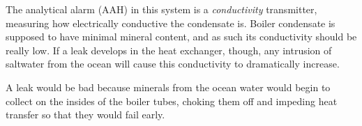 












The analytical alarm (AAH) in this system is a {\it conductivity} transmitter, measuring how electrically conductive the condensate is.  Boiler condensate is supposed to have minimal mineral content, and as such its conductivity should be really low.  If a leak develops in the heat exchanger, though, any intrusion of saltwater from the ocean will cause this conductivity to dramatically increase.

\vskip 10pt

A leak would be bad because minerals from the ocean water would begin to collect on the insides of the boiler tubes, choking them off and impeding heat transfer so that they would fail early.



